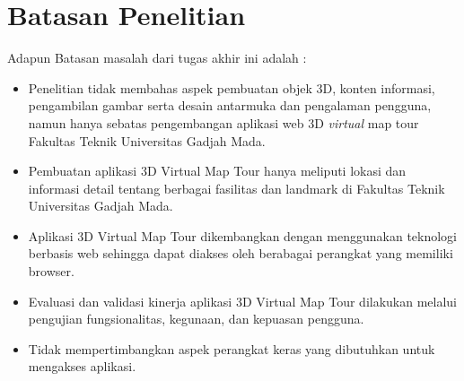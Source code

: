		


\section{Batasan Penelitian}

Adapun Batasan masalah dari tugas akhir ini adalah :

\begin{itemize}
\item Penelitian tidak membahas aspek pembuatan objek 3D, konten informasi, pengambilan gambar serta desain antarmuka dan pengalaman pengguna, namun hanya sebatas pengembangan aplikasi web 3D \emph{virtual} map tour Fakultas Teknik Universitas Gadjah Mada.
\item Pembuatan aplikasi 3D Virtual Map Tour hanya meliputi lokasi dan informasi detail tentang berbagai fasilitas dan landmark di Fakultas Teknik Universitas Gadjah Mada.
\item Aplikasi 3D Virtual Map Tour dikembangkan dengan menggunakan teknologi berbasis web sehingga dapat diakses oleh berabagai perangkat yang memiliki browser.
\item Evaluasi dan validasi kinerja aplikasi 3D Virtual Map Tour dilakukan melalui pengujian fungsionalitas, kegunaan, dan kepuasan pengguna.
\item Tidak mempertimbangkan aspek perangkat keras yang dibutuhkan untuk mengakses aplikasi.
\end{itemize}

